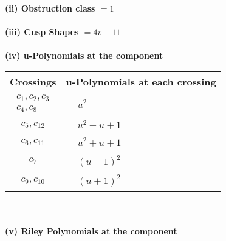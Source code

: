 \documentclass[1p]{elsarticle_modified}
\theoremstyle{definition}
\begin{document}
\flushleft \textbf{(ii) Obstruction class $= 1$}\\~\\
\flushleft \textbf{(iii) Cusp Shapes $= 4 v-11$}\\~\\
\newpage\renewcommand{\arraystretch}{1}
\flushleft \textbf{(iv) u-Polynomials at the component}\newline \\
\begin{tabular}{m{50pt}|m{274pt}}
Crossings & \hspace{64pt}u-Polynomials at each crossing \\
\hline $$\begin{aligned}c_{1},c_{2},c_{3}\\c_{4},c_{8}\end{aligned}$$&$\begin{aligned}
&u^2
\end{aligned}$\\
\hline $$\begin{aligned}c_{5},c_{12}\end{aligned}$$&$\begin{aligned}
&u^2- u+1
\end{aligned}$\\
\hline $$\begin{aligned}c_{6},c_{11}\end{aligned}$$&$\begin{aligned}
&u^2+u+1
\end{aligned}$\\
\hline $$\begin{aligned}c_{7}\end{aligned}$$&$\begin{aligned}
&(u-1)^2
\end{aligned}$\\
\hline $$\begin{aligned}c_{9},c_{10}\end{aligned}$$&$\begin{aligned}
&(u+1)^2
\end{aligned}$\\
\hline
\end{tabular}\\~\\
\newpage\renewcommand{\arraystretch}{1}
\flushleft \textbf{(v) Riley Polynomials at the component}\newline \\
\end{document}
